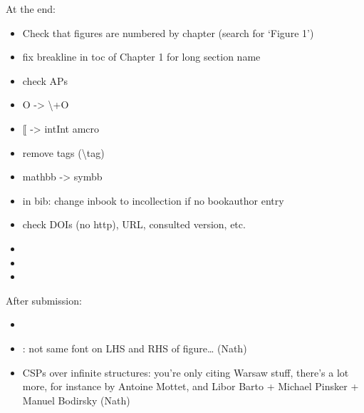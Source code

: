 At the end:
\begin{itemize}
	\item Check that figures are numbered by chapter (search for `Figure 1')
	\item fix breakline in toc of Chapter 1 for long section name
	\item check APs 
	\item O -> \backslash+O
	\item $\lBrack$ -> intInt amcro
	\item remove tags (\textsf{\backslash tag})
	\item mathbb -> symbb
	\item in bib: change inbook to incollection if no bookauthor entry
	\item check DOIs (no http), URL, consulted version, etc.
	\item {}
	\item {}
	\item {}
\end{itemize}

After submission:
\begin{itemize}
	\item {}
	\item {}: not same font on LHS and RHS of figure… (Nath)
	\item CSPs over infinite structures: you're only citing Warsaw stuff, there's a lot more, for instance by Antoine Mottet, and Libor Barto + Michael Pinsker + Manuel Bodirsky (Nath)
\end{itemize}